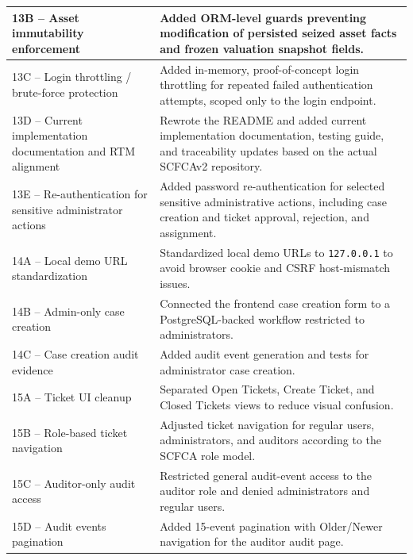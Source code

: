 \documentclass[12pt,a4paper]{report}
\begin{document}
\begin{longtable}{|p{6.2cm}|p{10cm}|}
 13B -- Asset immutability enforcement &
Added ORM-level guards preventing modification of persisted seized asset facts and frozen valuation snapshot fields. \\
\hline

 13C -- Login throttling / brute-force protection &
Added in-memory, proof-of-concept login throttling for repeated failed authentication attempts, scoped only to the login endpoint. \\
\hline

 13D -- Current implementation documentation and RTM alignment &
Rewrote the README and added current implementation documentation, testing guide, and traceability updates based on the actual SCFCAv2 repository. \\
\hline

 13E -- Re-authentication for sensitive administrator actions &
Added password re-authentication for selected sensitive administrative actions, including case creation and ticket approval, rejection, and assignment. \\
\hline

 14A -- Local demo URL standardization &
Standardized local demo URLs to \texttt{127.0.0.1} to avoid browser cookie and CSRF host-mismatch issues. \\
\hline

 14B -- Admin-only case creation &
Connected the frontend case creation form to a PostgreSQL-backed workflow restricted to administrators. \\
\hline

 14C -- Case creation audit evidence &
Added audit event generation and tests for administrator case creation. \\
\hline

 15A -- Ticket UI cleanup &
Separated Open Tickets, Create Ticket, and Closed Tickets views to reduce visual confusion. \\
\hline

 15B -- Role-based ticket navigation &
Adjusted ticket navigation for regular users, administrators, and auditors according to the SCFCA role model. \\
\hline

 15C -- Auditor-only audit access &
Restricted general audit-event access to the auditor role and denied administrators and regular users. \\
\hline

 15D -- Audit events pagination &
Added 15-event pagination with Older/Newer navigation for the auditor audit page. \\
\hline


\end{longtable}
\end{document}
